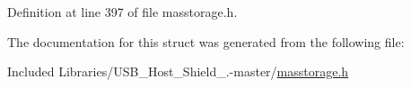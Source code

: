 \-Definition at line 397 of file masstorage.\-h.



\-The documentation for this struct was generated from the following file\-:\begin{DoxyCompactItemize}
\item 
\-Included Libraries/\-U\-S\-B\-\_\-\-Host\-\_\-\-Shield\-\_.-\/master/\hyperlink{masstorage_8h}{masstorage.\-h}\end{DoxyCompactItemize}
